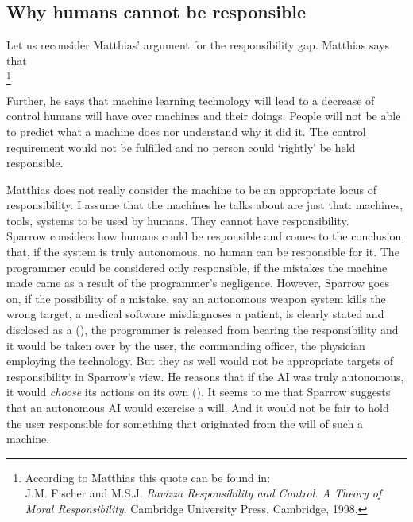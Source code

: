 \documentclass{article}
\begin{document}

\subsection{Why humans cannot be responsible}

Let us reconsider Matthias' argument for the responsibility gap. Matthias says
that\\

\footnote{According to Matthias this quote can be found in:\\
J.M. Fischer and M.S.J. \textit{Ravizza Responsibility and Control. A Theory of
Moral Responsibility}. Cambridge University Press, Cambridge, 1998.}

Further, he says that machine learning technology will lead to a decrease of
control humans will have over machines and their doings. People will not be able
to predict what a machine does nor understand why it did it. The control
requirement would not be fulfilled and no person could `rightly' be held
responsible.

Matthias does not really consider the machine to be an appropriate locus of
responsibility. I assume that the machines he talks about are just that:
machines, tools, systems to be used by humans. They cannot have
responsibility.\\

Sparrow considers how humans could be responsible and comes to the conclusion,
that, if the system is truly autonomous, no human can be responsible for it. The
programmer could be considered only responsible, if the mistakes the machine
made came as a result of the programmer's negligence. However, Sparrow goes on,
if the possibility of a mistake, say an autonomous weapon system kills the wrong
target, a medical software misdiagnoses a patient, is clearly stated and
disclosed as a  (\cite[p. 69]{sparrow2007killer}),
the programmer is released from bearing the responsibility and it would be taken
over by the user, the commanding officer, the physician employing the
technology. But they as well would not be appropriate targets of responsibility
in Sparrow's view. He reasons that if the AI was truly autonomous, it would
\textit{choose} its actions on its own (\cite[p. 70]{sparrow2007killer}). It
seems to me that Sparrow suggests that an autonomous AI would exercise a will.
And it would not be fair to hold the user responsible for something that
originated from the will of such a machine.
\end{document}
